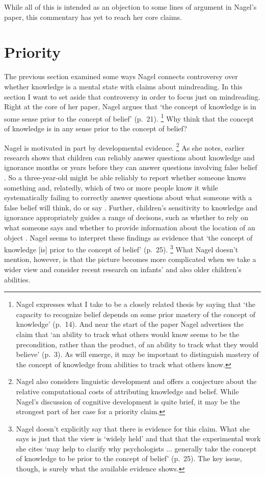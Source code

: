 \documentclass[11pt,a4paper]{extarticle}
\begin{document}
While all of this is intended as an objection to some lines of argument in Nagel's paper, this commentary has yet to reach her core claims.




\section{Priority}
The previous section examined some ways  Nagel connects  controversy over whether knowledge is a mental state with claims about mindreading.
In this section I want to set aside that controversy in order to focus just on mindreading.
Right at the core of her paper, Nagel argues that  `the concept of knowledge is in some sense prior to the concept of belief' (p.\ 21).%
\footnote{
Nagel expresses what I take to be a closely related thesis by saying that `the capacity to recognize belief depends on some prior mastery of the concept of knowledge' (p.\ 14).
And near the start of the paper Nagel advertises the claim that `an ability to track what others would know seems to be the precondition, rather than the product, of an ability to track what they would believe' (p.\ 3).
As will emerge,
it may be important to distinguish mastery of the concept of knowledge from abilities to track what others know.
}
Why think that the concept of knowledge is in any sense prior to the concept of belief?

Nagel is motivated in part by developmental evidence.%
\footnote{
Nagel also considers linguistic development and offers a conjecture about the relative computational costs of attributing knowledge and belief.
While Nagel's discussion of cognitive development is quite brief, it may be the strongest part of her case for a priority claim.
}
As she notes, earlier research shows that
children can reliably answer questions about knowledge and ignorance months or years before they can answer questions involving false belief \citep{hogrefe_ignorance_1986}.
So a three-year-old might be able reliably to report whether someone knows something and, relatedly, which of two or more people know it while systematically failing to correctly answer questions about what someone with a false belief will think, do or say \citep{Wellman:2001lz}.
Further, children's sensitivity to knowledge and ignorance appropriately guides a range of decisons, 
such as whether to rely on what someone says \citep{Robinson:1999sq,Robinson:2003bh} 
and whether to provide information about the location of an object \citep{Dunham:2000tv,Liszkowski:2008al}.
Nagel seems to interpret these findings as evidence that `the concept of knowledge [is] prior to the concept of belief' (p.\ 25).%
\footnote{
Nagel doesn't explicitly say that there is evidence for this claim.
What she says is just that the view is `widely held' and that that the experimental work she cites `may help to clarify why psychologists ... generally take the concept of knowledge to be prior to the concept of belief' (p.\ 25).
The key issue, though, is surely what the available evidence shows.
} 
What Nagel doesn't mention, however, is that the picture becomes more complicated when we take a wider view and consider recent research on infants' and also older children's abilities.
\end{document}
